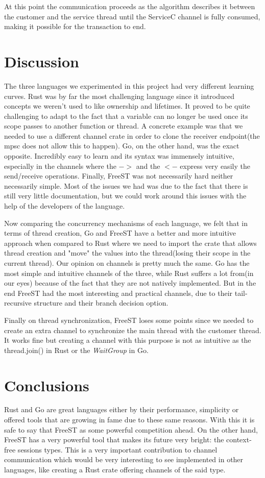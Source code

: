 \documentclass[runningheads]{llncs}
\begin{document}
At this point the communication proceeds as the algorithm describes it between the customer and the service thread until the ServiceC channel is fully consumed, making it possible for the transaction to end.
\section{Discussion}
The three languages we experimented in this project had very different learning curves. Rust was by far the most challenging language since it introduced concepts we weren't used to like ownership and lifetimes. It proved to be quite challenging to adapt to the fact that a variable can no longer be used once its scope passes to another function or thread. A concrete example was that we needed to use a different channel crate in order to clone the receiver endpoint(the mpsc does not allow this to happen). Go, on the other hand, was the exact opposite. Incredibly easy to learn and its syntax was immensely intuitive, especially in the channels where the $->$ and the $<-$ express very easily the send/receive operations. Finally, FreeST was not necessarily hard neither necessarily simple. Most of the issues we had was due to the fact that there is still very little documentation, but we could work around this issues with the help of the developers of the language.

Now comparing the concurrency mechanisms of each language, we felt that in terms of thread creation, Go and FreeST have a better and more intuitive approach when compared to Rust where we need to import the crate that allows thread creation and "move" the values into the thread(losing their scope in the current thread).
Our opinion on channels is pretty much the same. Go has the most simple and intuitive channels of the three, while Rust suffers a lot from(in our eyes) because of the fact that they are not natively implemented. But in the end FreeST had the most interesting and practical channels, due to their tail-recursive structure and their branch decision option.

Finally on thread synchronization, FreeST loses some points since we needed to create an extra channel to synchronize the main thread with the customer thread. It works fine but creating a channel with this purpose is not as intuitive as the thread.join() in Rust or the {\it WaitGroup} in Go.


\section{Conclusions}
Rust and Go are great languages either by their performance, simplicity or offered tools that are growing in fame due to these same reasons. With this it is safe to say that FreeST as some powerful competition ahead. On the other hand, FreeST has a very powerful tool that makes its future very bright: the context-free sessions types.
This is a very important contribution to channel communication which would be very interesting to see implemented in other languages, like creating a Rust crate offering channels of the said type.
\end{document}
